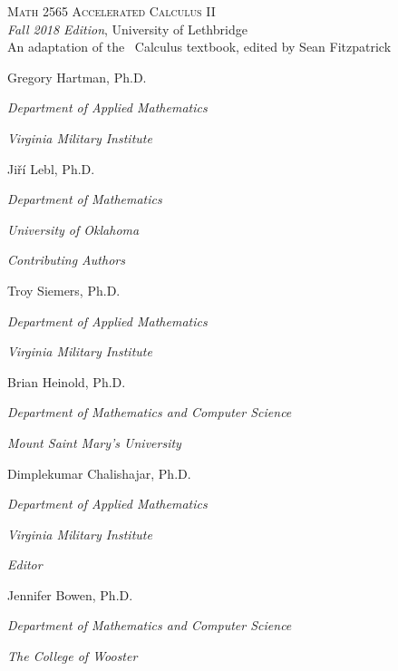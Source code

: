 
\hskip 125pt\begin{minipage}{\textwidth}
\begin{flushright}

\textsc{{\Huge Math 2565 Accelerated Calculus II}} \\

\textsl{\large Fall 2018 Edition}, 
{\large University of Lethbridge}\\

{An adaptation of the \apex\ Calculus textbook, edited by Sean Fitzpatrick}

\bigskip

\Large

Gregory Hartman, Ph.D.

\emph{\small Department of Applied Mathematics}

\emph{\small Virginia Military Institute}\vskip15pt

Ji{\v r}\'i Lebl, Ph.D.

\emph{\small Department of Mathematics}

\emph{\small University of Oklahoma}

\parbox{200pt}{\textit{Contributing Authors}}\hskip 2cm \phantom{.}

Troy Siemers, Ph.D.

\emph{\small Department of Applied Mathematics}

\emph{\small Virginia Military Institute}\vskip 15pt

Brian Heinold, Ph.D.

\emph{\small Department of Mathematics and Computer Science}

\emph{\small Mount Saint Mary's University}\vskip 15pt

Dimplekumar Chalishajar, Ph.D.

\emph{\small Department of Applied Mathematics}

\emph{\small Virginia Military Institute}\vskip 25pt



\parbox{200pt}{\textit{Editor}}\hskip 2cm \phantom{.}

Jennifer Bowen, Ph.D.

\emph{\small Department of Mathematics and Computer Science}

\emph{\small The College of Wooster}


\normalsize
\end{flushright}
\end{minipage}

